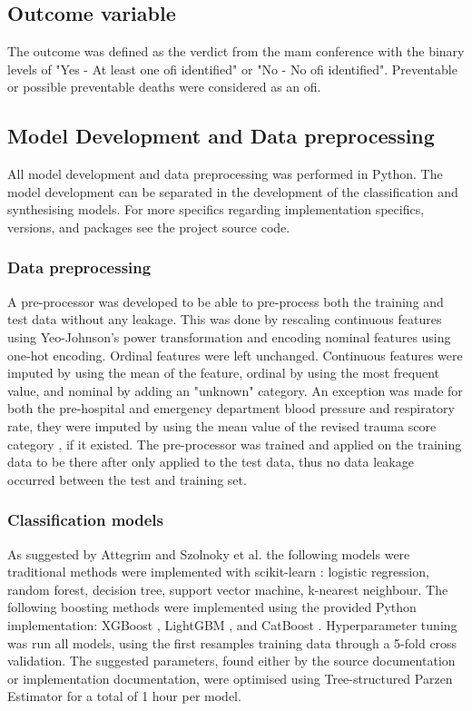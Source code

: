 \documentclass[12pt, letterpaper]{article}
\begin{document}
\subsection{Outcome variable}
The outcome was defined as the verdict from the \acrshort{mam} conference with the binary levels of "Yes - At least one \acrshort{ofi} identified" or "No - No \acrshort{ofi} identified". Preventable or possible preventable deaths were considered as an \acrshort{ofi}.

\subsection{Model Development and Data preprocessing}
All model development and data preprocessing was performed in Python. The model development can be separated in the development of the classification and synthesising models. For more specifics regarding implementation specifics, versions, and packages see the project source code.

\subsubsection*{Data preprocessing}
A pre-processor was developed to be able to pre-process both the training and test data without any leakage. This was done by rescaling continuous features using Yeo-Johnson's power transformation \cite{yeo_new_2000} and encoding nominal features using one-hot encoding. Ordinal features were left unchanged. Continuous features were imputed by using the mean of the feature, ordinal by using the most frequent value, and nominal by adding an "unknown" category. An exception was made for both the pre-hospital and emergency department blood pressure and respiratory rate, they were imputed by using the mean value of the revised trauma score category \cite{ringdal_utstein_2008}, if it existed. The pre-processor was trained and applied on the training data to be there after only applied to the test data, thus no data leakage occurred between the test and training set.

\subsubsection*{Classification models}
As suggested by Attegrim and Szolnoky et al. \cite{attergrim_predicting_2023} the following models were traditional methods were implemented with scikit-learn \cite{pedregosa_scikit_2011}: logistic regression, random forest, decision tree, support vector machine, k-nearest neighbour. The following boosting methods were implemented using the provided Python implementation: XGBoost \cite{chen_xgboost_2016}, LightGBM \cite{ke_lightgbm_2017}, and CatBoost \cite{prokhorenkova_catboost_2018}. Hyperparameter tuning was run all models, using the first resamples training data through a 5-fold cross validation. The suggested parameters, found either by the source documentation or implementation documentation, were optimised using Tree-structured Parzen Estimator \cite{bergstra_algorithms_2011} for a total of 1 hour per model.
\end{document}
